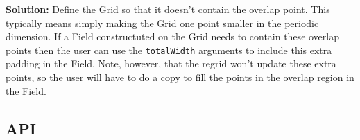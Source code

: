  \smallskip

 {\bf Solution:} Define the Grid so that it doesn't contain the overlap point. This typically means simply making
 the Grid one point smaller in the periodic dimension.  If a Field 
 constructuted on the Grid needs to contain these overlap points then the user can use the
 {\tt totalWidth} arguments to include this extra padding in the Field. Note, however, 
 that the regrid won't update these extra points, so the user will have to do a copy to fill the points
 in the overlap region in the Field.  


\subsection{API}

